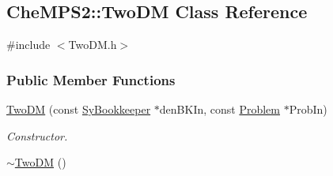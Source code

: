 \hypertarget{classCheMPS2_1_1TwoDM}{\subsection{Che\-M\-P\-S2\-:\-:Two\-D\-M Class Reference}
\label{classCheMPS2_1_1TwoDM}
}


{\ttfamily \#include $<$Two\-D\-M.\-h$>$}

\subsubsection*{Public Member Functions}
\begin{DoxyCompactItemize}
\item 
\hyperlink{classCheMPS2_1_1TwoDM_adafda7081d8bb8670482ef8d79485961}{Two\-D\-M} (const \hyperlink{classCheMPS2_1_1SyBookkeeper}{Sy\-Bookkeeper} $\ast$den\-B\-K\-In, const \hyperlink{classCheMPS2_1_1Problem}{Problem} $\ast$Prob\-In)
\begin{DoxyCompactList}\small\item\em Constructor. \end{DoxyCompactList}\item 
\hypertarget{classCheMPS2_1_1TwoDM_ae76f74e153484c87b54d4c4152283752}{\hyperlink{classCheMPS2_1_1TwoDM_ae76f74e153484c87b54d4c4152283752}{$\sim$\-Two\-D\-M} ()}\label{classCheMPS2_1_1TwoDM_ae76f74e153484c87b54d4c4152283752}


\end{DoxyCompactItemize}
